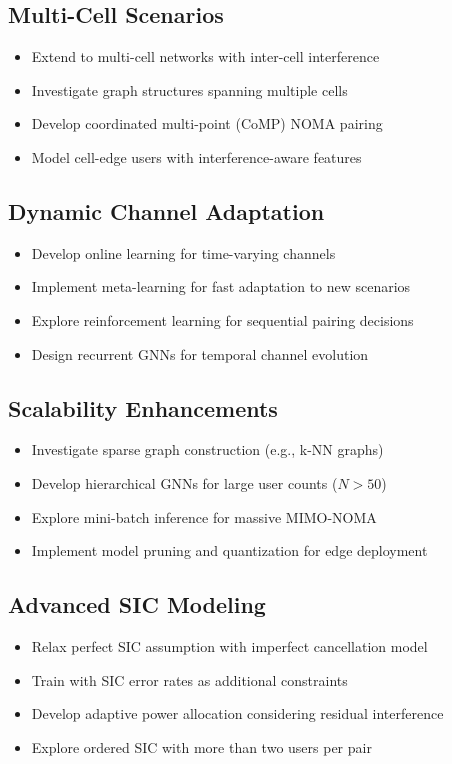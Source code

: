 \subsection{Multi-Cell Scenarios}
\begin{itemize}
    \item Extend to multi-cell networks with inter-cell interference
    \item Investigate graph structures spanning multiple cells
    \item Develop coordinated multi-point (CoMP) NOMA pairing
    \item Model cell-edge users with interference-aware features
\end{itemize}

\subsection{Dynamic Channel Adaptation}
\begin{itemize}
    \item Develop online learning for time-varying channels
    \item Implement meta-learning for fast adaptation to new scenarios
    \item Explore reinforcement learning for sequential pairing decisions
    \item Design recurrent GNNs for temporal channel evolution
\end{itemize}

\subsection{Scalability Enhancements}
\begin{itemize}
    \item Investigate sparse graph construction (e.g., k-NN graphs)
    \item Develop hierarchical GNNs for large user counts ($N > 50$)
    \item Explore mini-batch inference for massive MIMO-NOMA
    \item Implement model pruning and quantization for edge deployment
\end{itemize}

\subsection{Advanced SIC Modeling}
\begin{itemize}
    \item Relax perfect SIC assumption with imperfect cancellation model
    \item Train with SIC error rates as additional constraints
    \item Develop adaptive power allocation considering residual interference
    \item Explore ordered SIC with more than two users per pair
\end{itemize}

